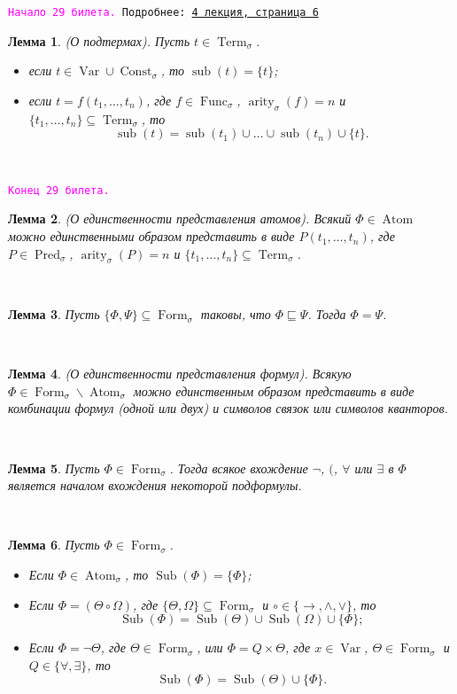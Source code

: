 \documentclass[a4paper,100pt]{article}
\theoremstyle{indented}
\newtheorem{lemma}{Лемма}
\theoremstyle{definition}
\theoremstyle{remark}
\DeclareMathOperator{\ra}{\rightarrow}
\DeclareMathOperator{\form}{Form}
\DeclareMathOperator{\Pred}{Pred}
\DeclareMathOperator{\Func}{Func}
\DeclareMathOperator{\Const}{Const}
\DeclareMathOperator{\arity}{arity}
\DeclareMathOperator{\Var}{Var}
\DeclareMathOperator{\Term}{Term}
\DeclareMathOperator{\sub}{sub}
\DeclareMathOperator{\Sub}{Sub}
\DeclareMathOperator{\Atom}{Atom}
\begin{document}
\texttt{\hypertarget{b29}{\textcolor{magenta}{Начало 29 билета.}} Подробнее: \href{http://www.mi-ras.ru/~speranski/courses/logic-1-2021-spring/slides_4.pdf}{4 лекция, страница 6}} \\

\begin{lemma}
  (О подтермах). Пусть $t\in\Term_\sigma$. 

  \begin{itemize}
    \item если $t\in \Var \cup \Const_\sigma$, то $\sub(t)=\{t\}$;
    \item если $t=f(t_1, \ldots, t_n)$, где $f\in \Func_\sigma$, $\arity_\sigma(f)=n$ и $\{t_1, \ldots, t_n\}\subseteq \Term_\sigma$, то 
    \[
      \sub(t)=\sub(t_1)\cup\ldots\cup \sub(t_n)\cup \{ t \}. 
    \]
  \end{itemize}
\end{lemma} \ 

\texttt{\textcolor{magenta}{Конец 29 билета.}} 

\hrulefill

\begin{lemma}
  (О единственности представления атомов). Всякий $\Phi \in \Atom$ можно единственными образом представить в виде $P(t_1, \ldots, t_n)$, где $P\in \Pred_\sigma$, $\arity_\sigma(P)=n$ и $\{t_1, \ldots, t_n\}\subseteq \Term_\sigma$. 
\end{lemma} \ 

\begin{lemma}
  Пусть $\{\Phi, \Psi\}\subseteq \form_\sigma$ таковы, что $\Phi \sqsubseteq \Psi$. Тогда $\Phi = \Psi$. 
\end{lemma} \ 

\begin{lemma}
  (О единственности представления формул). Всякую $\Phi\in \form_\sigma \backslash \Atom_\sigma$ можно единственным образом представить в виде комбинации формул (одной или двух) и символов связок или символов кванторов.
\end{lemma} \ 

\begin{lemma}
  Пусть $\Phi\in \form_\sigma$. Тогда всякое вхождение $\neg$, $($, $\forall$ или $\exists$ в $\Phi$ является началом вхождения некоторой подформулы.
\end{lemma} \ 

\begin{lemma}
  Пусть $\Phi \in \form_\sigma$. 

  \begin{itemize}
    \item Если $\Phi \in \Atom_\sigma$, то $\Sub (\Phi)=\{ \Phi\}$;
    \item Если $\Phi = (\Theta \circ \Omega)$, где $\{\Theta, \Omega\}\subseteq \form_\sigma$ и $\circ \in \{\ra, \wedge, \vee\}$, то 
    \[
      \Sub(\Phi)=\Sub(\Theta)\cup \Sub(\Omega)\cup \{\Phi\};
    \]
    \item Если $\Phi=\neg \Theta$, где $\Theta \in \form_\sigma$, или $\Phi=Q\times \Theta$, где $x\in \Var$, $\Theta \in \form_\sigma$ и $Q\in \{\forall, \exists\}$, то 
    \[
      \Sub(\Phi)= \Sub(\Theta)\cup \{\Phi\}. 
    \]
  \end{itemize}
\end{lemma}
\end{document}
